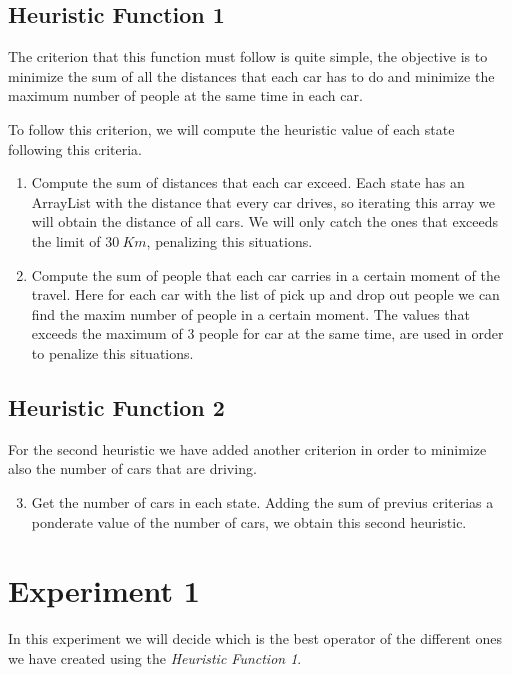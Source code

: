 \documentclass[12]{article}
\begin{document}
\subsection{Heuristic Function 1}

The criterion that this function must follow is quite simple, the objective is to minimize the sum of all the distances that each car has to do and minimize the maximum number of people at the same time in each car.

To follow this criterion, we will compute the heuristic value of each state following this criteria.

\begin{enumerate}
  \item Compute the sum of distances that each car exceed. Each state has an ArrayList with the distance that every car drives, so iterating this array we will obtain the distance of all cars. We will only catch the ones that exceeds the limit of $30\ Km$, penalizing this situations.
  \item Compute the sum of people that each car carries in a certain moment of the travel. Here for each car with the list of pick up and drop out people we can find the maxim number of people in a certain moment. The values that exceeds the maximum of 3 people for car at the same time, are used in order to penalize this situations.
\end{enumerate}

\subsection{Heuristic Function 2}

For the second heuristic we have added another criterion in order to minimize also the number of cars that are driving. 

\begin{enumerate}
  \setcounter{enumi}{2}
  \item Get the number of cars in each state. Adding the sum of previus criterias a ponderate value of the number of cars, we obtain this second heuristic.
\end{enumerate}


\section{Experiment 1}
In this experiment we will decide which is the best operator of the different ones we have created using the \textit{Heuristic Function 1}. 
\\
\medskip 
\end{document}

